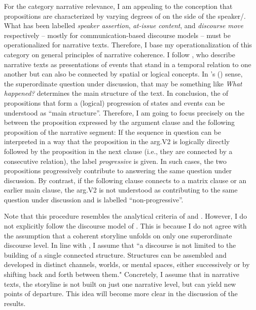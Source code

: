 \documentclass[output=paper,colorlinks,citecolor=brown]{langscibook}
\begin{document}
For the category narrative relevance, I am appealing to the conception that propositions are characterized by varying degrees of  on the side of the speaker/. What has been labelled \textit{speaker assertion}, \textit{at-issue content}, and \textit{discourse move} respectively -- mostly for communication-based discourse models -- must be operationalized for narrative texts. Therefore, I base my operationalization of this category on general principles of narrative coherence. I follow \citet{KleinStutterheim1992}, who describe narrative texts as presentations of events that stand in a temporal relation to one another but can also be connected by spatial or logical concepts. In \citeauthor{KleinStutterheim1992}'s (\citeyear{KleinStutterheim1992}) sense, the superordinate question under discussion, that may be something like \textit{What happened?} determines the main structure of the text. In conclusion, the  of propositions that form a (logical) progression of states and events can be understood as “main structure”. Therefore, I am going to focus precisely on the  between the proposition expressed by the argument clause and the following proposition of the narrative segment: If the sequence in question can be interpreted in a way that the proposition in the arg.V2 is logically directly followed by the proposition in the next clause (i.e., they are connected by a consecutive relation), the label \textit{progressive} is given. In such cases, the two propositions progressively contribute to answering the same question under discussion. By contrast, if the following clause connects to a matrix clause or an earlier main clause, the arg.V2 is not understood as contributing to the same question under discussion and is labelled “non-progressive”.

Note that this procedure resembles the analytical criteria of \citet{hinterholzl2010v1} and \citet{speyer2010}. However, I do not explicitly follow the discourse model of \citet{AsherLascarides2003}. This is because I do not agree with the assumption that a coherent storyline unfolds on only one superordinate discourse level. In line with \citet[177]{langacker2001}, I assume that “a discourse is not limited to the building of a single connected structure. Structures can be assembled and developed in distinct channels, worlds, or mental spaces, either successively or by shifting back and forth between them." Concretely, I assume that in narrative texts, the storyline is not built on just one narrative level, but can yield new points of departure. This idea will become more clear in the discussion of the results.
\end{document}
